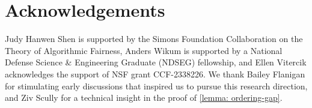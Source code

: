 \section*{Acknowledgements}
Judy Hanwen Shen is supported by the Simons Foundation Collaboration on the Theory of Algorithmic Fairness, Anders Wikum is supported by a National Defense Science \& Engineering Graduate (NDSEG) fellowship, and Ellen Vitercik acknowledges the support of NSF grant CCF-2338226. We thank Bailey Flanigan for stimulating early discussions that inspired us to pursue this research direction, and Ziv Scully for a technical insight in the proof of \cref{lemma: ordering-gap}.